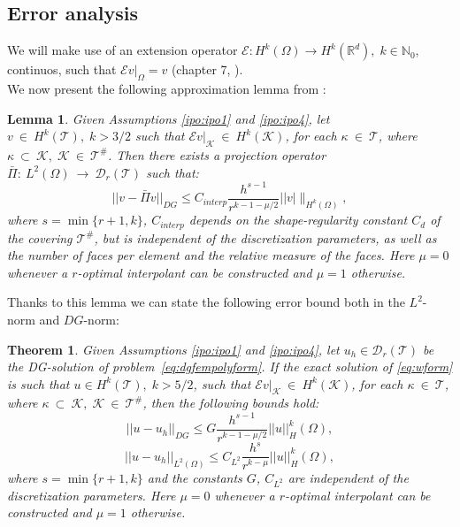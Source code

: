 \documentclass[12pt, a4paper]{article}
\theoremstyle{definition}
\theoremstyle{plain}
\newtheorem{lemma}{Lemma}
\theoremstyle{plain}
\newtheorem{teor}{Theorem}
\begin{document}
\subsection{Error analysis}
We will make use of an extension operator $\mathcal{E}:H^k(\Omega)\rightarrow H^k(\mathbb{R}^d), \; k\in\mathbb{N}_0$, continuos, such that $\mathcal{E}v|_\Omega=v$ (chapter 7, \cite{salsa}).\\
We now present the following approximation lemma from \cite{multigrid}:
\begin{lemma}  \label{lemma:interp}
	Given Assumptions \ref{ipo:ipo1} and \ref{ipo:ipo4}, let $v~\in~H^k(\mathcal{T}), \; k>3/2$ such that $\mathcal{E}v|_\mathcal{K}~\in~H^k(\mathcal{K})$, for each $\kappa~\in~\mathcal{T}$, where $\kappa~\subset~\mathcal{K}, \; \mathcal{K}~\in~\mathcal{T}^\#$. Then there exists a projection operator $\bar{\Pi}:~L^2(\Omega)~\rightarrow~\mathcal{D}_r(\mathcal{T})$ such that:
	\begin{equation}
		\big|\!\big| v - \bar{\Pi}v \big|\!\big|_{DG}
		\leq C_{interp} \frac{h^{s-1}}{r^{k-1-\mu/2}} |\!| v |\|_{H^k(\Omega)},
	\end{equation}
	where $s = \min \{r+1, k\}$, $C_{interp}$ depends on the shape-regularity constant $C_d$ of the covering $\mathcal{T}^\#$, but is independent of the discretization parameters, as well as the number of faces per element and the relative measure of the faces. Here $\mu = 0$ whenever a $r$-optimal interpolant can be constructed and $\mu = 1$ otherwise.
\end{lemma}
Thanks to this lemma we can state the following error bound both in the $L^2$-norm and $DG$-norm:
\begin{teor}
	Given Assumptions \ref{ipo:ipo1} and \ref{ipo:ipo4}, let $u_h \in \mathcal{D}_r(\mathcal{T})$ be the DG-solution of problem~\eqref{eq:dgfempolyform}. If the exact solution of \eqref{eq:wform} is such that $u\in H^k(\mathcal{T}), \; k>5/2$, such that $\mathcal{E}v|_\mathcal{K}~\in~H^k(\mathcal{K})$, for each $\kappa~\in~\mathcal{T}$, where $\kappa~\subset~\mathcal{K}, \; \mathcal{K}~\in~\mathcal{T}^\#$, then the following bounds hold:
	\begin{equation} \label{eq:dgbound}
		|\!|u-u_h|\!|_{DG} \leq G \frac{h^{s-1}}{r^{k-1-\mu /2}} |\!|u|\!|_H^k(\Omega),
	\end{equation}
	\begin{equation} \label{eq:l2bound}
		|\!|u-u_h|\!|_{L^2(\Omega)} \leq C_{L^2} \frac{h^s}{r^{k-\mu}} |\!|u|\!|_H^k(\Omega),
	\end{equation}
	where $s = \min \{r+1, k\}$ and the constants $G$, $C_{L^2}$ are independent of the discretization parameters. Here $\mu = 0$ whenever a $r$-optimal interpolant can be constructed and $\mu = 1$ otherwise.
\end{teor}
\end{document}
